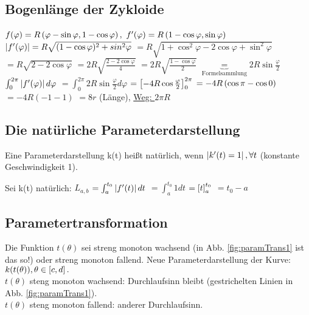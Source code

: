 \renewcommand{\ldate}{2015-10-23}

\subsection{Bogenlänge der Zykloide}
$f(\varphi)=R  \left( \varphi - \sin \varphi, 1 - \cos \varphi \right) , $
$f'(\varphi)= R  \left( 1-\cos \varphi, \sin \varphi \right)  $\\
$ \left\vert f'(\varphi) \right\vert  = R \sqrt{(1-\cos \varphi)^2 + sin^2 \varphi}$
$= R \sqrt{1+\cos^2 \varphi - 2 \cos \varphi + \sin^2 \varphi}$
$= R \sqrt{2-2\cos \varphi}$
$= 2 R \sqrt{\frac{2-2\cos \varphi}{4}}$
$= 2 R \sqrt{\frac{1- \cos \varphi}{2}}$
$\underbrace{=}_{\textrm{Formelsammlung}} 2R \sin \frac{\varphi}{2}$\\
$\int_{0}^{2\pi}  \left\vert f'(\varphi) \right\vert  d\varphi$
$=\int_{0}^{2\pi} 2 R \sin \frac{\varphi}{2} d\varphi$
$=  \left[ -4 R \cos \frac{\varphi}{2} \right] _{0}^{2\pi}$
$= - 4 R  \left( \cos \pi - \cos 0 \right) $
$=- 4 R (-1-1)$
\underline{$=8 r$} (Länge), \underline{Weg: $2\pi R$}

\subsection{Die natürliche Parameterdarstellung}

\begin{defi}
Eine Parameterdarstellung k(t) heißt natürlich, wenn $  \left\vert k'(t)=1 \right\vert , \forall t $ (konstante Geschwindigkeit 1).
\end{defi}
Sei k(t) natürlich: 
$L_{a,b}$
$= \int_{a}^{t_0}  \left\vert f'(t) \right\vert  dt$
$= \int_{a}^{t_0} 1 dt$
$=  \left[ t \right] _{a}^{t_0}$
\underline{$= t_0 -a$}

\subsection{Parametertransformation}
Die Funktion $t(\theta)$ sei streng monoton wachsend (in Abb. \ref{fig:paramTrans1} ist das so!) oder streng monoton fallend. Neue Parameterdarstellung der Kurve: $k(t(\theta)), \theta \in  \left[ c,d \right] .$\\
$t(\theta)$ steng monoton wachsend: Durchlaufsinn bleibt (gestrichelten Linien in Abb. \ref{fig:paramTrans1}).\\
$t(\theta)$ steng monoton fallend: anderer Durchlaufsinn.

